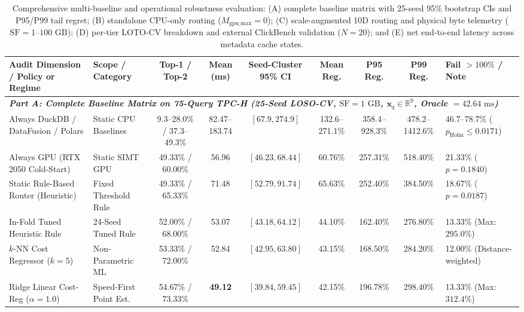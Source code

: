 \documentclass[10pt,a4paper]{article}
\newenvironment{fitasttable}{%
  \begin{lrbox}{\asttblbox}%
}{%
  \end{lrbox}%
  \sbox{\asttblboxB}{%
    \ifdim\wd\asttblbox>0.96\textwidth
      \resizebox{0.96\textwidth}{!}{\usebox{\asttblbox}}%
    \else
      \usebox{\asttblbox}%
    \fi
  }%
  \ifdim\ht\asttblboxB>0.72\textheight
    \resizebox{!}{0.72\textheight}{\usebox{\asttblboxB}}%
  \else
    \usebox{\asttblboxB}%
  \fi
}
\begin{document}
\begin{table}[t!]
\centering
\caption{Comprehensive multi-baseline and operational robustness evaluation: (A) complete baseline matrix with 25-seed 95\% bootstrap CIs and P95/P99 tail regret; (B) standalone CPU-only routing ($M_{\text{gpu\_max}}=0$); (C) scale-augmented 10D routing and physical byte telemetry ($\text{SF}=1\text{--}100\text{ GB}$); (D) per-tier LOTO-CV breakdown and external ClickBench validation ($N=20$); and (E) net end-to-end latency across metadata cache states.}\label{tab:jbd_step3_t14}
\label{tab:step3_comprehensive_audit}
\scriptsize
\setlength{\tabcolsep}{2.8pt}
\renewcommand{\arraystretch}{1.06}
\begin{fitasttable}
\begin{tabular}{@{}llccccccl@{}}
\hline
\textbf{Audit Dimension / Policy or Regime} & \textbf{Scope / Category} & \textbf{Top-1 / Top-2} & \textbf{Mean (ms)} & \textbf{Seed-Cluster 95\% CI} & \textbf{Mean Reg.} & \textbf{P95 Reg.} & \textbf{P99 Reg.} & \textbf{Fail $>100\%$ / Note} \\
\hline
\multicolumn{9}{l}{\textit{\textbf{Part A: Complete Baseline Matrix on 75-Query TPC-H (25-Seed LOSO-CV, $\text{SF}=1\text{ GB}$, $\mathbf{x}_q\in\mathbb{R}^9$, Oracle $=42.64\text{ ms}$)}}} \\
Always DuckDB / DataFusion / Polars & Static CPU Baselines & 9.3--28.0\% / 37.3--49.3\% & 82.47--183.74 & $[67.9, 274.9]$ & 132.6--271.1\% & 358.4--928.3\% & 478.2--1412.6\% & 46.7--78.7\% ($p_{\text{Holm}}\le 0.0171$) \\
Always GPU (RTX 2050 Cold-Start) & Static SIMT GPU & 49.33\% / 60.00\% & 56.96 & $[46.23, 68.44]$ & 60.76\% & 257.31\% & 518.40\% & 21.33\% ($p=0.1840$) \\
Static Rule-Based Router (Heuristic) & Fixed Threshold Rule & 49.33\% / 65.33\% & 71.48 & $[52.79, 91.74]$ & 65.63\% & 252.40\% & 384.50\% & 18.67\% ($p=0.0187$) \\
In-Fold Tuned Heuristic Rule & 24-Seed Tuned Rule & 52.00\% / 68.00\% & 53.07 & $[43.18, 64.12]$ & 44.10\% & 162.40\% & 276.80\% & 13.33\% (Max: $295.0\%$) \\
$k$-NN Cost Regressor ($k=5$) & Non-Parametric ML & 53.33\% / 72.00\% & 52.84 & $[42.95, 63.80]$ & 43.15\% & 168.50\% & 284.20\% & 12.00\% (Distance-weighted) \\
Ridge Linear Cost-Reg ($\alpha=1.0$) & Speed-First Point Est. & 54.67\% / 73.33\% & \textbf{49.12} & $[39.84, 59.45]$ & 42.15\% & 196.78\% & 298.40\% & 13.33\% (Max: $312.4\%$) \\

\end{tabular}
\end{fitasttable}
\end{table}
\end{document}
